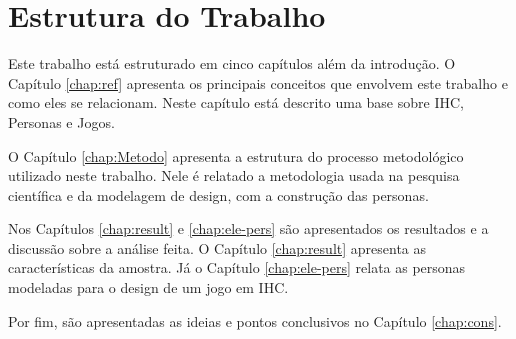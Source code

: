 

\section{Estrutura do Trabalho}

Este trabalho está estruturado em cinco capítulos além da introdução. O Capítulo \ref{chap:ref} apresenta os principais conceitos que envolvem este trabalho e como eles se relacionam. Neste capítulo está descrito uma base sobre IHC, Personas e Jogos.

O Capítulo \ref{chap:Metodo} apresenta a estrutura do processo metodológico utilizado neste trabalho. Nele é relatado a metodologia usada na pesquisa científica e da modelagem de design, com a construção das personas. 

Nos Capítulos \ref{chap:result} e \ref{chap:ele-pers} são apresentados os resultados e a discussão sobre a análise feita. O Capítulo \ref{chap:result} apresenta as características da amostra. Já o Capítulo \ref{chap:ele-pers} relata as personas modeladas para o design de um jogo em IHC. 

Por fim, são apresentadas as ideias e pontos conclusivos no Capítulo \ref{chap:cons}. 


